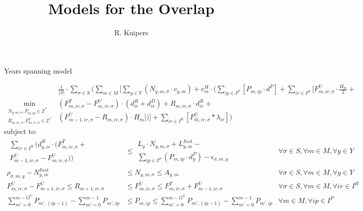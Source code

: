 \documentclass{beamer}
\title[Models for the Overlap]{Models for the Overlap}
\author{R. Kuipers}
\newcommand{\smalld}{\tiny}
\begin{document}
\begin{frame}{Years spanning model}
\smalld

\begin{equation}
	\min_{\substack{N_{y,m,\sigma}, P_{m,ip} \in \mathbb{Z}^* \\ 
	R_{m,ir,\sigma}, F^U_{m,ir,\sigma} \in \mathbb{Z}^* }}
	\begin{aligned}
	\frac{1}{|S|} \cdot \sum_{\sigma \in S} ( \sum_{m \in M} [ \sum_{y \in Y} 
	(N_{y,m,\sigma} \cdot c_{y,m}) +  
	e^H_m \cdot (\sum_{ip \in I^P} [P_{m,ip} \cdot d^P] + 
	\sum_{ir \in I^R}[F^U_{m,ir,\sigma} \cdot \frac{H_m}{2} + \\
	(F^T_{m,ir,\sigma} - F^U_{m,ir,\sigma}) \cdot (d^R_{ir} + d^D_{ir}) + 
	R_{m,ir,\sigma}  \cdot d^R_{ir} + \\
	(F^U_{m-1, ir, \sigma} - R_{m, ir, \sigma}) \cdot H_m])] + 
	\sum_{ir \in I^R} [F^U_{\hat{m}, ir, \sigma} * \lambda_{ir}] )
	\end{aligned}	
\end{equation}
subject to:
\begin{align}
\begin{aligned} \sum_{ir\in I^R} (d^R_{y, ir} \cdot (F^T_{m,ir,\sigma} + \\ F^U_{m-1,ir,\sigma} - F^U_{m,ir,\sigma})) \end{aligned}	
						&\leq		\begin{aligned} L_y \cdot N_{y,m,\sigma} + L^{Inst}_{y,m} - \\ \sum_{ip \in I^P} (P_{m,ip} \cdot d^P_y) - \epsilon_{\sigma, m, y} \end{aligned}																		& \forall \sigma \in S, \forall m \in M, \forall y \in Y	\\
\rho_{ \sigma, m, y} - N^{Inst}_{y,m}	&\leq		 N_{y,m,\sigma}	\leq 	A_{y,m} 							& \forall \sigma \in S, \forall m \in M, \forall y \in Y 	\\
F^U_{m, ir, \sigma} - F^U_{m+1, ir, \sigma}	\leq	 R_{m+1,ir,\sigma}				&\leq		F^U_{m,ir,\sigma}	\leq	F^T_{m, ir, \sigma} + 	F^U_{m-1, ir, \sigma}					& \forall \sigma \in S, \forall m \in M, \forall ir \in I^R	\\
\sum_{m' = 0}^{m-G^U} P_{m',(ip-1)} - \sum_{m' = 0}^{m-1} P_{m',ip} 	&\leq P_{m,ip}	\leq 	\sum_{m' = 0}^{m-G^L} P_{m',(ip-1)} - \sum_{m' = 0}^{m-1} P_{m',ip}	
																				& \forall m \in M, \forall ip \in I^P			
\end{align}

\end{frame}
\end{document}
